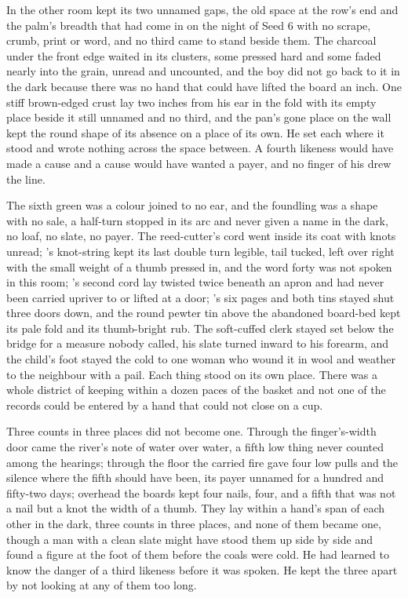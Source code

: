 \scenebreak

In the other room  kept its two unnamed gaps, the old space at the row's end and the palm's breadth that had come in on the night of Seed 6 with no scrape, crumb, print or word, and no third came to stand beside them. The charcoal under the front edge waited in its clusters, some pressed hard and some faded nearly into the grain, unread and uncounted, and the boy did not go back to it in the dark because there was no hand that could have lifted the board an inch. One stiff brown-edged crust lay two inches from his ear in the fold with its empty place beside it still unnamed and no third, and the pan's gone place on the wall kept the round shape of its absence on a place of its own. He set each where it stood and wrote nothing across the space between. A fourth likeness would have made a cause and a cause would have wanted a payer, and no finger of his drew the line.

The sixth green was a colour joined to no ear, and the foundling was a shape with no sale, a half-turn stopped in its arc and never given a name in the dark, no loaf, no slate, no payer. The reed-cutter's cord went inside its coat with knots unread; 's knot-string kept its last double turn legible, tail tucked, left over right with the small weight of a thumb pressed in, and the word forty was not spoken in this room; 's second cord lay twisted twice beneath an apron and had never been carried upriver to  or lifted at a door; 's six pages and both tins stayed shut three doors down, and the round pewter tin above the abandoned board-bed kept its pale fold and its thumb-bright rub. The soft-cuffed clerk stayed set below the bridge for a measure nobody called, his slate turned inward to his forearm, and the child's foot stayed the cold to one woman who wound it in wool and weather to the neighbour with a pail. Each thing stood on its own place. There was a whole district of keeping within a dozen paces of the basket and not one of the records could be entered by a hand that could not close on a cup.

Three counts in three places did not become one. Through the finger's-width door came the river's note of water over water, a fifth low thing never counted among the hearings; through the floor the carried fire gave four low pulls and the silence where the fifth should have been, its payer unnamed for a hundred and fifty-two days; overhead the boards kept four nails, four, and a fifth that was not a nail but a knot the width of a thumb. They lay within a hand's span of each other in the dark, three counts in three places, and none of them became one, though a man with a clean slate might have stood them up side by side and found a figure at the foot of them before the coals were cold. He had learned to know the danger of a third likeness before it was spoken. He kept the three apart by not looking at any of them too long.

